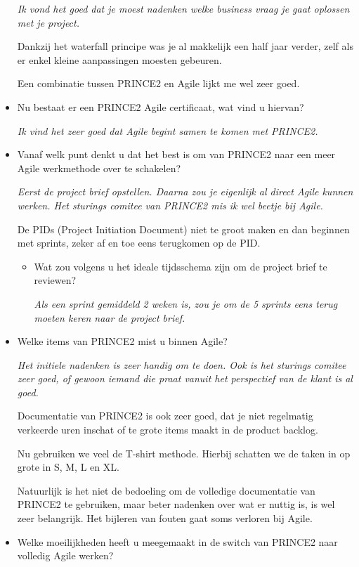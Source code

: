 \documentclass[]{article}
\begin{document}
\begin{itemize}
	{\it 
		Ik vond het goed dat je moest nadenken welke business vraag je gaat oplossen met je project.
		
		Dankzij het waterfall principe was je al makkelijk een half jaar verder, zelf als er enkel kleine aanpassingen moesten gebeuren.
		
		Een combinatie tussen PRINCE2 en Agile lijkt me wel zeer goed.
	}
	\item Nu bestaat er een PRINCE2 Agile certificaat, wat vind u hiervan?
	
	{\it 
		Ik vind het zeer goed dat Agile begint samen te komen met PRINCE2.
	}
	\item Vanaf welk punt denkt u dat het best is om van PRINCE2 naar een meer Agile werkmethode over te schakelen?
	
	{\it 
		Eerst de project brief opstellen. Daarna zou je eigenlijk al direct Agile kunnen werken. Het sturings comitee van PRINCE2 mis ik wel beetje bij Agile. 
		
		De PIDs (Project Initiation Document) niet te groot maken en dan beginnen met sprints, zeker af en toe eens terugkomen op de PID.
	}
	\begin{itemize}
		\item Wat zou volgens u het ideale tijdsschema zijn om de project brief te reviewen?
		
		{\it 
			Als een sprint gemiddeld 2 weken is, zou je om de 5 sprints eens terug moeten keren naar de project brief.
		}
	\end{itemize}
	\item Welke items van PRINCE2 mist u binnen Agile?
	
	{\it 
		Het initiele nadenken is zeer handig om te doen. Ook is het sturings comitee zeer goed, of gewoon iemand die praat vanuit het perspectief van de klant is al goed.
		
		Documentatie van PRINCE2 is ook zeer goed, dat je niet regelmatig verkeerde uren inschat of te grote items maakt in de product backlog.
		
		Nu gebruiken we veel de T-shirt methode. Hierbij schatten we de taken in op grote in S, M, L en XL. 
		
		Natuurlijk is het niet de bedoeling om de volledige documentatie van PRINCE2 te gebruiken, maar beter nadenken over wat er nuttig is, is wel zeer belangrijk. Het bijleren van fouten gaat soms verloren bij Agile.
	}
	\item Welke moeilijkheden heeft u meegemaakt in de switch van PRINCE2 naar volledig Agile werken?
	

\end{itemize}
\end{document}
